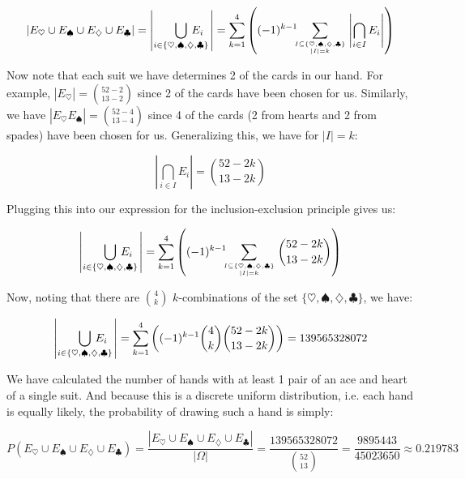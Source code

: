 \documentclass{article}
\begin{document}
\begin{equation*}
    |E_\heartsuit\cup E_\spadesuit\cup E_\diamondsuit\cup E_\clubsuit|=\left|\bigcup_{i\in\{\heartsuit,\spadesuit,\diamondsuit,\clubsuit\}}\mkern-30muE_i\mkern+10mu\right|=\sum_{k=1}^4\left((-1)^{k-1}\mkern-10mu\sum _{I\subseteq \{\heartsuit,\spadesuit,\diamondsuit,\clubsuit\} \atop |I|=k}\left|\bigcap_{i\in I}E_i\right|\right)
\end{equation*}

Now note that each suit we have determines 2 of the cards in our hand. For example, $|E_\heartsuit|=\binom{52-2}{13-2}$ since 2 of the cards have been chosen for us. Similarly, we have $|E_\heartsuit E_\spadesuit|=\binom{52-4}{13-4}$ since 4 of the cards (2 from hearts and 2 from spades) have been chosen for us. Generalizing this, we have for $|I|=k$:

\begin{equation*}
    \left|\bigcap_{i\in I}E_i\right|=\binom{52-2k}{13-2k}
\end{equation*}

Plugging this into our expression for the inclusion-exclusion principle gives us:

\begin{equation*}
    \left|\bigcup_{i\in\{\heartsuit,\spadesuit,\diamondsuit,\clubsuit\}}\mkern-30muE_i\mkern+10mu\right|=\sum_{k=1}^4\left((-1)^{k-1}\mkern-10mu\sum _{I\subseteq \{\heartsuit,\spadesuit,\diamondsuit,\clubsuit\} \atop |I|=k}\binom{52-2k}{13-2k}\right)
\end{equation*}

Now, noting that there are $\binom{4}{k}$ $k$-combinations of the set $\{\heartsuit,\spadesuit,\diamondsuit,\clubsuit\}$, we have:

\begin{equation*}
    \left|\bigcup_{i\in\{\heartsuit,\spadesuit,\diamondsuit,\clubsuit\}}\mkern-30muE_i\mkern+10mu\right|=\sum_{k=1}^4\left((-1)^{k-1}\binom{4}{k}\binom{52-2k}{13-2k}\right)=139565328072
\end{equation*}

We have calculated the number of hands with at least 1 pair of an ace and heart of a single suit. And because this is a discrete uniform distribution, i.e. each hand is equally likely, the probability of drawing such a hand is simply:

\begin{equation*}
    P(E_\heartsuit\cup E_\spadesuit\cup E_\diamondsuit\cup E_\clubsuit)=\frac{|E_\heartsuit\cup E_\spadesuit\cup E_\diamondsuit\cup E_\clubsuit|}{|\Omega|}=\frac{139565328072}{\binom{52}{13}}=\frac{9895443}{45023650}\approx0.219783
\end{equation*}
\end{document}
